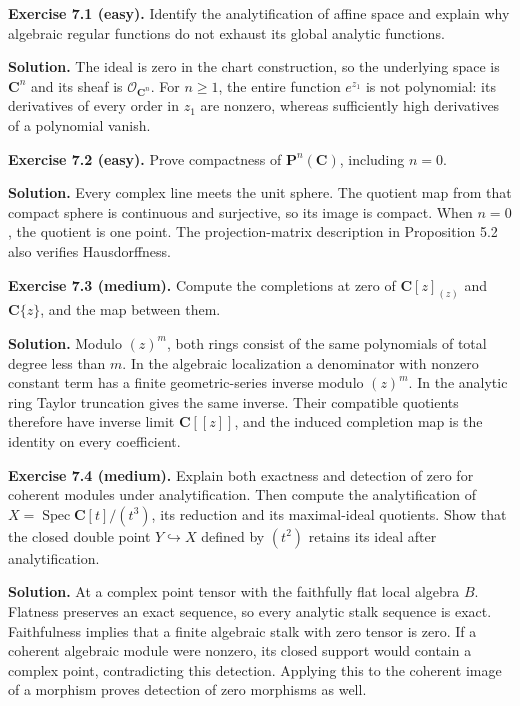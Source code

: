 \documentclass[11pt]{article}
\begin{document}
\textbf{Exercise 7.1 (easy).} Identify the analytification of affine
space and explain why algebraic regular functions do not exhaust its
global analytic functions.

\textbf{Solution.} The ideal is zero in the chart construction, so the
underlying space is \(\mathbf C^n\) and its sheaf is
\(\mathcal O_{\mathbf C^n}\). For \(n\geq1\), the entire function
\(e^{z_1}\) is not polynomial: its derivatives of every order in \(z_1\)
are nonzero, whereas sufficiently high derivatives of a polynomial
vanish.

\textbf{Exercise 7.2 (easy).} Prove compactness of
\(\mathbf P^n(\mathbf C)\), including \(n=0\).

\textbf{Solution.} Every complex line meets the unit sphere. The
quotient map from that compact sphere is continuous and surjective, so
its image is compact. When \(n=0\), the quotient is one point. The
projection-matrix description in Proposition 5.2 also verifies
Hausdorffness.

\textbf{Exercise 7.3 (medium).} Compute the completions at zero of
\(\mathbf C[z]_{(z)}\) and \(\mathbf C\{z\}\), and the map between them.

\textbf{Solution.} Modulo \((z)^m\), both rings consist of the same
polynomials of total degree less than \(m\). In the algebraic
localization a denominator with nonzero constant term has a finite
geometric-series inverse modulo \((z)^m\). In the analytic ring Taylor
truncation gives the same inverse. Their compatible quotients therefore
have inverse limit \(\mathbf C[[z]]\), and the induced completion map is
the identity on every coefficient.

\textbf{Exercise 7.4 (medium).} Explain both exactness and detection of
zero for coherent modules under analytification. Then compute the
analytification of \(X=\operatorname{Spec}\mathbf C[t]/(t^3)\), its
reduction and its maximal-ideal quotients. Show that the closed double
point \(Y\hookrightarrow X\) defined by \((t^2)\) retains its ideal
after analytification.

\textbf{Solution.} At a complex point tensor with the faithfully flat
local algebra \(B\). Flatness preserves an exact sequence, so every
analytic stalk sequence is exact. Faithfulness implies that a finite
algebraic stalk with zero tensor is zero. If a coherent algebraic module
were nonzero, its closed support would contain a complex point,
contradicting this detection. Applying this to the coherent image of a
morphism proves detection of zero morphisms as well.
\end{document}
